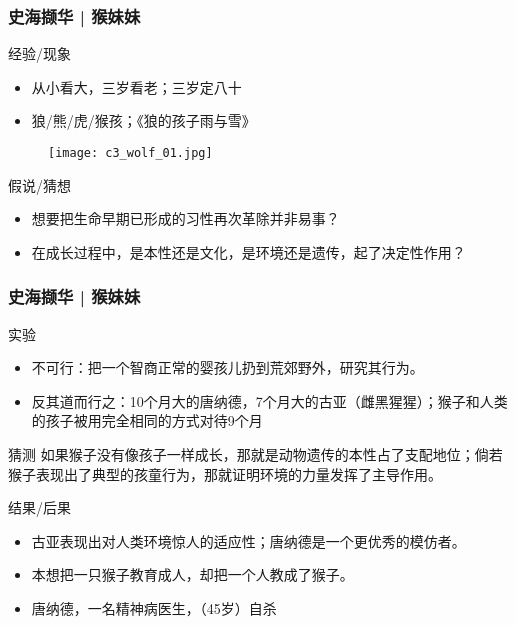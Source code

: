 \begin{frame}
  \frametitle{史海撷华 | 猴妹妹}
  \begin{block}{经验/现象}
    \begin{itemize}
      \item 从小看大，三岁看老；三岁定八十
      \item 狼/熊/虎/猴孩；《狼的孩子雨与雪》
    \end{itemize}
    \vspace{-1em}
    \begin{figure}
      \centering
      \texttt{[image: c3\_wolf\_01.jpg]}
    \end{figure}
  \end{block}
  \pause
  \begin{block}{假说/猜想}
    \begin{itemize}
      \item 想要把生命早期已形成的习性再次革除并非易事？
      \item 在成长过程中，是本性还是文化，是环境还是遗传，起了决定性作用？
    \end{itemize}
  \end{block}
\end{frame}

\begin{frame}
  \frametitle{史海撷华 | 猴妹妹}
  \begin{block}{实验}
    \begin{itemize}
      \item 不可行：把一个智商正常的婴孩儿扔到荒郊野外，研究其行为。
      \item 反其道而行之：10个月大的唐纳德，7个月大的古亚（雌黑猩猩）；猴子和人类的孩子被用完全相同的方式对待9个月
    \end{itemize}
  \end{block}
  \vspace{-0.5em}
  \pause
  \begin{block}{猜测}
    如果猴子没有像孩子一样成长，那就是动物遗传的本性占了支配地位；倘若猴子表现出了典型的孩童行为，那就证明环境的力量发挥了主导作用。
  \end{block}
  \vspace{-0.5em}
  \pause
  \begin{block}{结果/后果}
    \begin{itemize}
      \item 古亚表现出对人类环境惊人的适应性；唐纳德是一个更优秀的模仿者。
      \item 本想把一只猴子教育成人，却把一个人教成了猴子。
      \item 唐纳德，一名精神病医生，（45岁）自杀
    \end{itemize}
  \end{block}
\end{frame}

